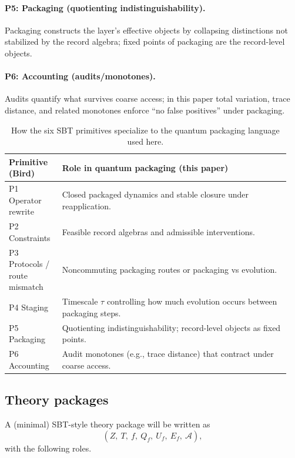 \paragraph{P5: Packaging (quotienting indistinguishability).}
Packaging constructs the layer’s effective objects by collapsing distinctions not stabilized by the record algebra; fixed points of packaging are the record-level objects.

\paragraph{P6: Accounting (audits/monotones).}
Audits quantify what survives coarse access; in this paper total variation, trace distance, and related monotones enforce ``no false positives'' under packaging.

\begin{table}[t]
\centering
\small
\begin{tabular}{@{}>{\raggedright\arraybackslash}p{0.18\linewidth}p{0.77\linewidth}@{}}
\toprule
\textbf{Primitive (Bird)} & \textbf{Role in quantum packaging (this paper)} \\
\midrule
P1 Operator rewrite & Closed packaged dynamics and stable closure under reapplication. \\
P2 Constraints & Feasible record algebras and admissible interventions. \\
P3 Protocols / route mismatch & Noncommuting packaging routes or packaging vs evolution. \\
P4 Staging & Timescale $\tau$ controlling how much evolution occurs between packaging steps. \\
P5 Packaging & Quotienting indistinguishability; record-level objects as fixed points. \\
P6 Accounting & Audit monotones (e.g., trace distance) that contract under coarse access. \\
\bottomrule
\end{tabular}
\caption{How the six SBT primitives specialize to the quantum packaging language used here.}
\label{tab:six-birds-quantum}
\end{table}

\subsection{Theory packages}

A (minimal) SBT-style theory package will be written as
\[
(Z,\ T,\ f,\ Q_f,\ U_f,\ E_f,\ \mathcal{A}),
\]
with the following roles.

